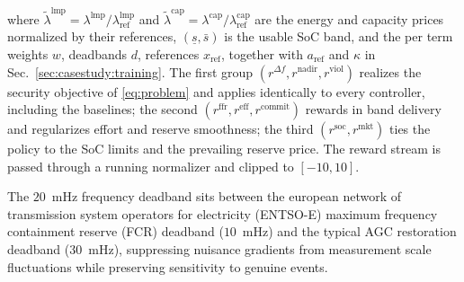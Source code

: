 \documentclass[lettersize,journal]{IEEEtran}
\begin{document}
	where $\tilde\lambda^{\mathrm{lmp}}=\lambda^{\mathrm{lmp}}/\lambda^{\mathrm{lmp}}_{\mathrm{ref}}$ and $\tilde\lambda^{\mathrm{cap}}=\lambda^{\mathrm{cap}}/\lambda^{\mathrm{cap}}_{\mathrm{ref}}$ are the energy and capacity prices normalized by their references, $(\underline s,\bar s)$ is the usable SoC band, and the per term weights $w$, deadbands $d$, references $x_{\mathrm{ref}}$, together with $a_{\mathrm{ref}}$ and $\kappa$ in Sec.~\ref{sec:casestudy:training}. The first group $(r^{\Delta f},r^{\mathrm{nadir}},r^{\mathrm{viol}})$ realizes the security objective of \eqref{eq:problem} and applies identically to every controller, including the baselines; the second $(r^{\mathrm{ffr}},r^{\mathrm{eff}},r^{\mathrm{commit}})$ rewards in band delivery and regularizes effort and reserve smoothness; the third $(r^{\mathrm{soc}},r^{\mathrm{mkt}})$ ties the policy to the SoC limits and the prevailing reserve price. The reward stream is passed through a running normalizer and clipped to $[-10,10]$.
	
	The $20$~mHz frequency deadband sits between the european network of transmission system operators for electricity (ENTSO-E) maximum frequency containment reserve (FCR) deadband ($10$~mHz) and the typical AGC restoration deadband ($30$~mHz), suppressing nuisance gradients from measurement scale fluctuations while preserving sensitivity to genuine events. 
	
	
\end{document}
